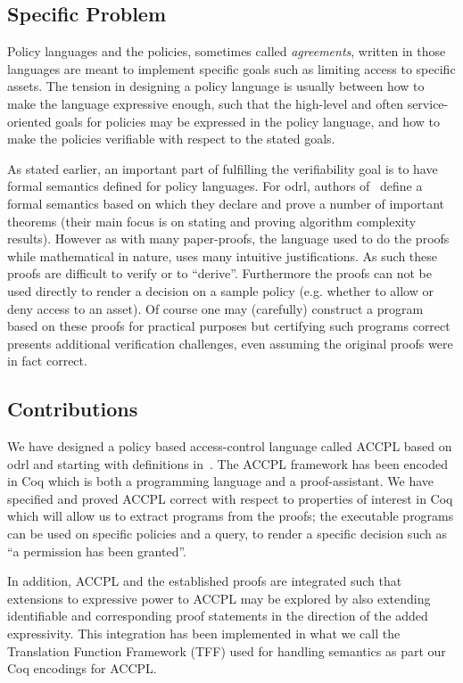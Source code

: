 \documentclass[conference]{IEEEtran}
\begin{document}
\subsection{Specific Problem}

Policy languages and the policies, sometimes called \emph{agreements}, written in those languages are meant to implement specific goals such as limiting access to specific assets. The tension in designing a policy language is usually between how to make the language expressive enough, such that the high-level and often service-oriented goals for policies may be expressed in the policy language, and how to make the policies verifiable with respect to the stated goals.

As stated earlier, an important part of fulfilling the verifiability goal is to have formal semantics defined for policy languages. For \ac{odrl}, authors of~\cite{pucella2006} define a formal semantics based on which they declare and prove a number of important theorems (their main focus is on stating and proving algorithm complexity results). However as with many paper-proofs, the language used to do the proofs while mathematical in nature, uses many intuitive justifications. As such these proofs are difficult to verify or to ``derive''. Furthermore the proofs can not be used directly to render a decision on a sample policy (e.g. whether to allow or deny access to an asset). Of course one may (carefully) construct a program based on these proofs for practical purposes but certifying such programs correct presents additional verification challenges, even assuming the original proofs were in fact correct.

\subsection{Contributions}\label{sec:contribs}

We have designed a policy based access-control language called \ac{ACCPL} based on \ac{odrl} and starting with definitions in~\cite{pucella2006}. The \ac{ACCPL} framework has been encoded in Coq which is both a programming language and a proof-assistant. We have specified and proved \ac{ACCPL} correct with respect to properties of interest in Coq which will allow us to extract programs from the proofs; the executable programs can be used on specific policies and a query, to render a specific decision such as ``a permission has been granted''. 

In addition, \ac{ACCPL} and the established proofs are integrated such that 
extensions to expressive power to \ac{ACCPL} may be explored by also extending identifiable and corresponding proof statements in the direction of the added expressivity. This integration has been implemented in what we call the Translation Function Framework (TFF) used for handling semantics as part our Coq encodings for \ac{ACCPL}.
\end{document}
